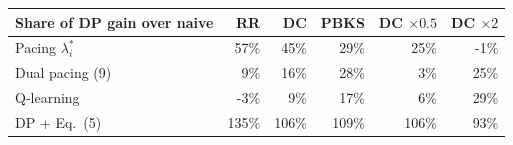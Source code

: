 \begin{tabular}{@{}lrrrrr@{}}\toprule
Share of DP gain over naive & RR & DC & PBKS & DC $\times0.5$ & DC $\times2$\\\midrule
Pacing $\lambda^*_i$ & 57\% & 45\% & 29\% & 25\% & -1\%\\
Dual pacing (9) & 9\% & 16\% & 28\% & 3\% & 25\%\\
Q-learning & -3\% & 9\% & 17\% & 6\% & 29\%\\
DP + Eq.~(5) & 135\% & 106\% & 109\% & 106\% & 93\%\\
\bottomrule\end{tabular}
